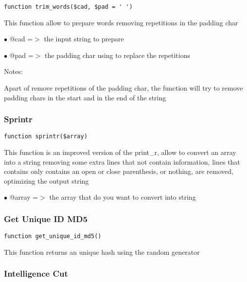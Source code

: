 \documentclass[a4paper]{article}
\begin{document}
\begin{lstlisting}
function trim_words($cad, $pad = ' ')
\end{lstlisting}

This function allow to prepare words removing repetitions in the padding char

\begin{compactitem}
\item[\color{myblue}$\bullet$] @cad =$>$ the input string to prepare
\item[\color{myblue}$\bullet$] @pad =$>$ the padding char using to replace the repetitions
\end{compactitem}

Notes:

Apart of remove repetitions of the padding char, the function will try to
remove padding chars in the start and in the end of the string

\hypertarget{toc241}{}
\subsubsection{Sprintr}

\begin{lstlisting}
function sprintr($array)
\end{lstlisting}

This function is an improved version of the print\_r, allow to convert an
array into a string removing some extra lines that not contain information,
lines that contains only contains an open or close parenthesis, or nothing,
are removed, optimizing the output string

\begin{compactitem}
\item[\color{myblue}$\bullet$] @array =$>$ the array that do you want to convert into string
\end{compactitem}

\hypertarget{toc242}{}
\subsubsection{Get Unique ID MD5}

\begin{lstlisting}
function get_unique_id_md5()
\end{lstlisting}

This function returns an unique hash using the random generator

\hypertarget{toc243}{}
\subsubsection{Intelligence Cut}
\end{document}
